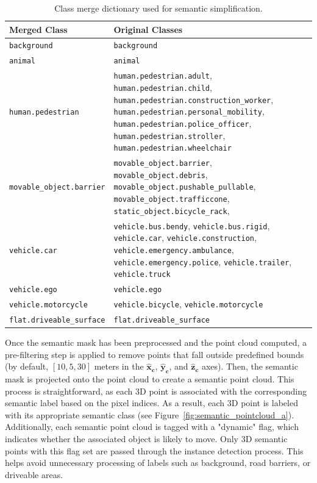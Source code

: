 \begin{table}[!ht]
    \centering
    \footnotesize
    \begin{tabular}{|l|p{10cm}|}
        \hline
        \textbf{Merged Class} & \textbf{Original Classes} \\
        \hline
        \texttt{background} & \texttt{background} \\ 
        \hline
        \texttt{animal} & \texttt{animal} \\
        \hline
        \texttt{human.pedestrian} &
        \texttt{human.pedestrian.adult}, \texttt{human.pedestrian.child}, \texttt{human.pedestrian.construction\_worker}, \texttt{human.pedestrian.personal\_mobility}, \texttt{human.pedestrian.police\_officer}, \texttt{human.pedestrian.stroller}, \texttt{human.pedestrian.wheelchair} \\
        \hline
        \texttt{movable\_object.barrier} &
        \texttt{movable\_object.barrier}, \texttt{movable\_object.debris}, \texttt{movable\_object.pushable\_pullable}, \texttt{movable\_object.trafficcone}, \texttt{static\_object.bicycle\_rack}, \\
        \hline
        \texttt{vehicle.car} & 
        \texttt{vehicle.bus.bendy}, \texttt{vehicle.bus.rigid}, \texttt{vehicle.car}, \texttt{vehicle.construction}, \texttt{vehicle.emergency.ambulance}, \texttt{vehicle.emergency.police}, \texttt{vehicle.trailer}, \texttt{vehicle.truck} \\
        \hline
        \texttt{vehicle.ego} & \texttt{vehicle.ego} \\
        \hline
        \texttt{vehicle.motorcycle} & 
        \texttt{vehicle.bicycle}, \texttt{vehicle.motorcycle} \\
        \hline
        \texttt{flat.driveable\_surface} & \texttt{flat.driveable\_surface} \\
        \hline
    \end{tabular}
    \caption{Class merge dictionary used for semantic simplification.}
    \label{tab:merge_dict}
\end{table}

Once the semantic mask has been preprocessed and the point cloud computed, a pre-filtering step is applied to remove points that fall outside predefined bounds (by default, $\left[10, 5, 30\right]$ meters in the $\mathbf{\hat{x}_c}$, $\mathbf{\hat{y}_c}$, and $\mathbf{\hat{z}_c}$ axes). Then, the semantic mask is projected onto the point cloud to create a semantic point cloud. This process is straightforward, as each 3D point is associated with the corresponding semantic label based on the pixel indices. As a result, each 3D point is labeled with its appropriate semantic class (see Figure~\ref{fig:semantic_pointcloud_a}). Additionally, each semantic point cloud is tagged with a "dynamic" flag, which indicates whether the associated object is likely to move. Only 3D semantic points with this flag set are passed through the instance detection process. This helps avoid unnecessary processing of labels such as background, road barriers, or driveable areas.

